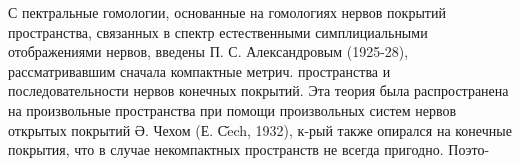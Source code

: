 \documentclass[10pt]{article}
\begin{document}
С пектральные гомологии, основанные на гомологиях нервов покрытий пространства, связанных в спектр естественными симплициальными отображениями нервов, введены П. С. Александровым (1925-28), рассматривавшим сначала компактные метрич. пространства и последовательности нервов конечных покрытий. Эта теория была распространена на произвольные пространства при помощи произвольных систем нервов открытых покрытий Ә. Чехом (Е. С̌ech, 1932), к-рый также опирался на конечные покрытия, что в случае некомпактных пространств не всегда пригодно. Поэто-
\end{document}
